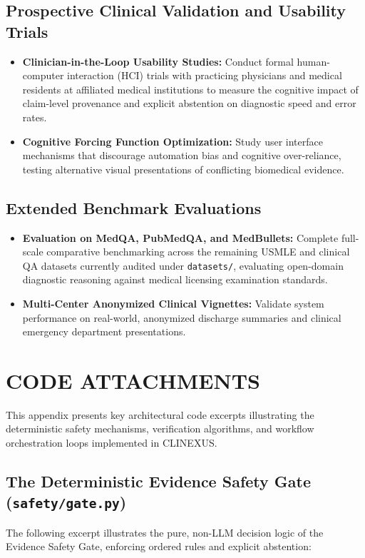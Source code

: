 \documentclass[12pt,a4paper]{report}
\begin{document}
\section{Prospective Clinical Validation and Usability Trials}
\begin{itemize}
    \item \textbf{Clinician-in-the-Loop Usability Studies:} Conduct formal human-computer interaction (HCI) trials with practicing physicians and medical residents at affiliated medical institutions to measure the cognitive impact of claim-level provenance and explicit abstention on diagnostic speed and error rates.
    \item \textbf{Cognitive Forcing Function Optimization:} Study user interface mechanisms that discourage automation bias and cognitive over-reliance, testing alternative visual presentations of conflicting biomedical evidence.
\end{itemize}

\section{Extended Benchmark Evaluations}
\begin{itemize}
    \item \textbf{Evaluation on MedQA, PubMedQA, and MedBullets:} Complete full-scale comparative benchmarking across the remaining USMLE and clinical QA datasets currently audited under \texttt{datasets/}, evaluating open-domain diagnostic reasoning against medical licensing examination standards.
    \item \textbf{Multi-Center Anonymized Clinical Vignettes:} Validate system performance on real-world, anonymized discharge summaries and clinical emergency department presentations.
\end{itemize}

\appendix
\chapter{CODE ATTACHMENTS}

This appendix presents key architectural code excerpts illustrating the deterministic safety mechanisms, verification algorithms, and workflow orchestration loops implemented in CLINEXUS.

\section{The Deterministic Evidence Safety Gate (\texttt{safety/gate.py})}
The following excerpt illustrates the pure, non-LLM decision logic of the Evidence Safety Gate, enforcing ordered rules and explicit abstention:
\end{document}
